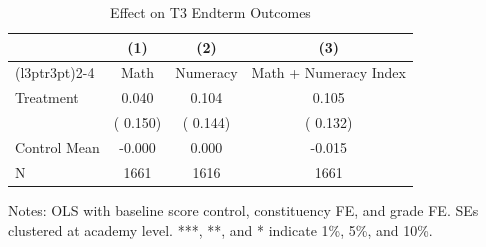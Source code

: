\begin{table}[!htbp]
\centering
\caption{Effect on T3 Endterm Outcomes}
\label{tab:ng_t3_ete}
\begin{threeparttable}
\begin{tabular}[t]{lccc}
\toprule
 & (1) & (2) & (3) \\
\cmidrule(l{3pt}r{3pt}){2-4}
 & Math & Numeracy & Math + Numeracy Index \\
\midrule
Treatment &   0.040 &   0.104 &   0.105 \\
 & (  0.150) & (  0.144) & (  0.132) \\
\addlinespace
Control Mean &  -0.000 &   0.000 &  -0.015 \\
N & 1661 & 1616 & 1661 \\
\bottomrule
\end{tabular}
\begin{tablenotes}[para]
\item Notes: OLS with baseline score control, constituency FE, and grade FE.
SEs clustered at academy level. ***, **, and * indicate 1\%, 5\%, and 10\%.
\end{tablenotes}
\end{threeparttable}
\end{table}
